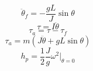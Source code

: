 \documentclass{article}
\begin{document}
    \[\ddot{\theta}_{f}= -\frac{gL}{J}\sin\theta\]
    \bigskip
    \[\tau = I\ddot{\theta}\]
    \bigskip
    \[\tau_{a} = \tau - \tau_f\]
    \bigskip
    \[\tau_{a} = m(J\ddot{\theta} + gL\sin{\theta})\]
    \bigskip
    \[h_p = \frac{1}{2}\frac{J}{g}\omega^2|_{\theta=0}\]
\end{document}
